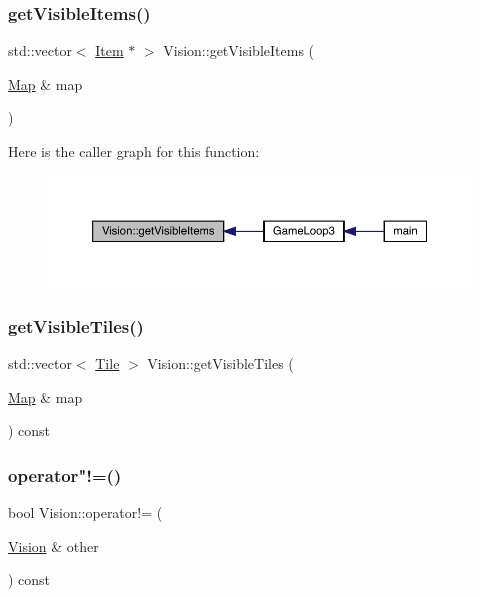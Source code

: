 \subsubsection{\texorpdfstring{get\+Visible\+Items()}{getVisibleItems()}}
{\footnotesize\ttfamily std\+::vector$<$ \mbox{\hyperlink{class_item}{Item}} $\ast$ $>$ Vision\+::get\+Visible\+Items (\begin{DoxyParamCaption}\item[{\mbox{\hyperlink{class_map}{Map}} \&}]{map }\end{DoxyParamCaption})}

Here is the caller graph for this function\+:
\nopagebreak
\begin{figure}[H]
\begin{center}
\leavevmode
\includegraphics[width=350pt]{class_vision_a57e240a165d83bd1869e4053af0a4569_icgraph}
\end{center}
\end{figure}
\mbox{\label{class_vision_a52683d5635319444a095ad79d6745c3b}} 
\subsubsection{\texorpdfstring{get\+Visible\+Tiles()}{getVisibleTiles()}}
{\footnotesize\ttfamily std\+::vector$<$ \mbox{\hyperlink{class_tile}{Tile}} $>$ Vision\+::get\+Visible\+Tiles (\begin{DoxyParamCaption}\item[{\mbox{\hyperlink{class_map}{Map}} \&}]{map }\end{DoxyParamCaption}) const}

\mbox{\label{class_vision_aae59cb11cc2ced8e1198f8c0c27b5f4b}} 
\subsubsection{\texorpdfstring{operator"!=()}{operator!=()}}
{\footnotesize\ttfamily bool Vision\+::operator!= (\begin{DoxyParamCaption}\item[{\mbox{\hyperlink{class_vision}{Vision}} \&}]{other }\end{DoxyParamCaption}) const}

